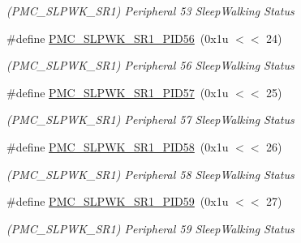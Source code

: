\begin{DoxyCompactItemize}
\begin{DoxyCompactList}\small\item\em (P\+M\+C\+\_\+\+S\+L\+P\+W\+K\+\_\+\+S\+R1) Peripheral 53 Sleep\+Walking Status \end{DoxyCompactList}\item 
\mbox{\label{group__SAME70__PMC_ga7b61d0e37abe1df3f48d029ce16a91a5}} 
\#define \mbox{\hyperlink{group__SAME70__PMC_ga7b61d0e37abe1df3f48d029ce16a91a5}{P\+M\+C\+\_\+\+S\+L\+P\+W\+K\+\_\+\+S\+R1\+\_\+\+P\+I\+D56}}~(0x1u $<$$<$ 24)
\begin{DoxyCompactList}\small\item\em (P\+M\+C\+\_\+\+S\+L\+P\+W\+K\+\_\+\+S\+R1) Peripheral 56 Sleep\+Walking Status \end{DoxyCompactList}\item 
\mbox{\label{group__SAME70__PMC_gab0cfc6c8f2bfb153f07f78341efa69a0}} 
\#define \mbox{\hyperlink{group__SAME70__PMC_gab0cfc6c8f2bfb153f07f78341efa69a0}{P\+M\+C\+\_\+\+S\+L\+P\+W\+K\+\_\+\+S\+R1\+\_\+\+P\+I\+D57}}~(0x1u $<$$<$ 25)
\begin{DoxyCompactList}\small\item\em (P\+M\+C\+\_\+\+S\+L\+P\+W\+K\+\_\+\+S\+R1) Peripheral 57 Sleep\+Walking Status \end{DoxyCompactList}\item 
\mbox{\label{group__SAME70__PMC_gaa52b4dbc91552c8cd37ef2797917e933}} 
\#define \mbox{\hyperlink{group__SAME70__PMC_gaa52b4dbc91552c8cd37ef2797917e933}{P\+M\+C\+\_\+\+S\+L\+P\+W\+K\+\_\+\+S\+R1\+\_\+\+P\+I\+D58}}~(0x1u $<$$<$ 26)
\begin{DoxyCompactList}\small\item\em (P\+M\+C\+\_\+\+S\+L\+P\+W\+K\+\_\+\+S\+R1) Peripheral 58 Sleep\+Walking Status \end{DoxyCompactList}\item 
\mbox{\label{group__SAME70__PMC_ga37ee13ef18e767c49075089e51f626f9}} 
\#define \mbox{\hyperlink{group__SAME70__PMC_ga37ee13ef18e767c49075089e51f626f9}{P\+M\+C\+\_\+\+S\+L\+P\+W\+K\+\_\+\+S\+R1\+\_\+\+P\+I\+D59}}~(0x1u $<$$<$ 27)
\begin{DoxyCompactList}\small\item\em (P\+M\+C\+\_\+\+S\+L\+P\+W\+K\+\_\+\+S\+R1) Peripheral 59 Sleep\+Walking Status \end{DoxyCompactList}\item 

\end{DoxyCompactItemize}
